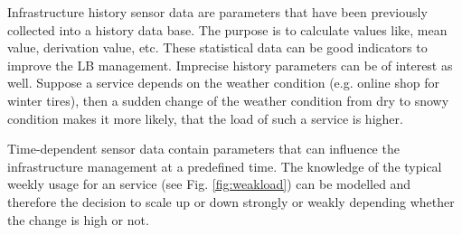 Infrastructure history sensor data are parameters that have been previously collected into a history data base. The purpose is to calculate values like, mean value, derivation value, etc. These statistical data can be good indicators to improve the LB management.
Imprecise history parameters can be of interest as well. Suppose a service depends on the weather condition (e.g. online shop for winter tires), then a sudden change of the weather condition from dry to snowy condition makes it more likely, that the load of such a service is higher.

Time-dependent sensor data contain parameters that can influence the infrastructure management at a predefined time. The knowledge of the typical weekly usage for an service (see Fig. \ref{fig:weakload}) can be modelled and therefore the decision to scale up or down strongly or weakly depending whether the change is high or not.

